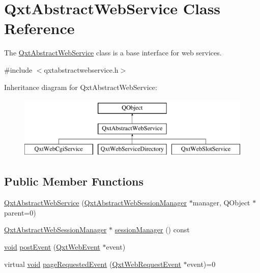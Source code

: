 \hypertarget{class_qxt_abstract_web_service}{\section{Qxt\-Abstract\-Web\-Service Class Reference}
\label{class_qxt_abstract_web_service}
}


The \hyperlink{class_qxt_abstract_web_service}{Qxt\-Abstract\-Web\-Service} class is a base interface for web services.  




{\ttfamily \#include $<$qxtabstractwebservice.\-h$>$}

Inheritance diagram for Qxt\-Abstract\-Web\-Service\-:\begin{figure}[H]
\begin{center}
\leavevmode
\includegraphics[height=3.000000cm]{class_qxt_abstract_web_service}
\end{center}
\end{figure}
\subsection*{Public Member Functions}
\begin{DoxyCompactItemize}
\item 
\hyperlink{class_qxt_abstract_web_service_a6b9a107c8e6ba2bc583bd4d157c3fe7b}{Qxt\-Abstract\-Web\-Service} (\hyperlink{class_qxt_abstract_web_session_manager}{Qxt\-Abstract\-Web\-Session\-Manager} $\ast$manager, Q\-Object $\ast$parent=0)
\item 
\hyperlink{class_qxt_abstract_web_session_manager}{Qxt\-Abstract\-Web\-Session\-Manager} $\ast$ \hyperlink{class_qxt_abstract_web_service_a1ef5bf24883bea3dea78d567d57bda46}{session\-Manager} () const 
\item 
\hyperlink{group___u_a_v_objects_plugin_ga444cf2ff3f0ecbe028adce838d373f5c}{void} \hyperlink{class_qxt_abstract_web_service_a5487b2135d56fd87a50c058e4a5317d7}{post\-Event} (\hyperlink{class_qxt_web_event}{Qxt\-Web\-Event} $\ast$event)
\item 
virtual \hyperlink{group___u_a_v_objects_plugin_ga444cf2ff3f0ecbe028adce838d373f5c}{void} \hyperlink{class_qxt_abstract_web_service_aca8a326b48edd775ea52ec9c3dc8daba}{page\-Requested\-Event} (\hyperlink{class_qxt_web_request_event}{Qxt\-Web\-Request\-Event} $\ast$event)=0
\end{DoxyCompactItemize}


